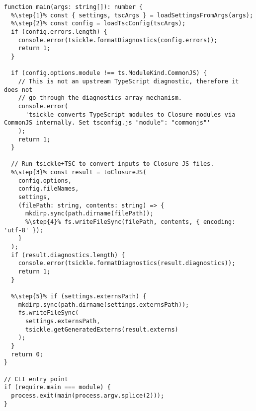 \begin{verbatim}
function main(args: string[]): number {
  %\step{1}% const { settings, tscArgs } = loadSettingsFromArgs(args);
  %\step{2}% const config = loadTscConfig(tscArgs);
  if (config.errors.length) {
    console.error(tsickle.formatDiagnostics(config.errors));
    return 1;
  }

  if (config.options.module !== ts.ModuleKind.CommonJS) {
    // This is not an upstream TypeScript diagnostic, therefore it does not
    // go through the diagnostics array mechanism.
    console.error(
      'tsickle converts TypeScript modules to Closure modules via CommonJS internally. Set tsconfig.js "module": "commonjs"'
    );
    return 1;
  }

  // Run tsickle+TSC to convert inputs to Closure JS files.
  %\step{3}% const result = toClosureJS(
    config.options,
    config.fileNames,
    settings,
    (filePath: string, contents: string) => {
      mkdirp.sync(path.dirname(filePath));
      %\step{4}% fs.writeFileSync(filePath, contents, { encoding: 'utf-8' });
    }
  );
  if (result.diagnostics.length) {
    console.error(tsickle.formatDiagnostics(result.diagnostics));
    return 1;
  }

  %\step{5}% if (settings.externsPath) {
    mkdirp.sync(path.dirname(settings.externsPath));
    fs.writeFileSync(
      settings.externsPath,
      tsickle.getGeneratedExterns(result.externs)
    );
  }
  return 0;
}

// CLI entry point
if (require.main === module) {
  process.exit(main(process.argv.splice(2)));
}
\end{verbatim}
